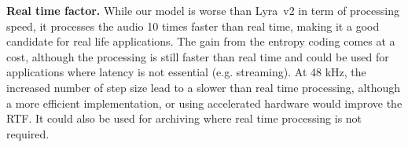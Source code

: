 {\noindent \bf Real time factor.}
While our model is worse than Lyra~v2 in term of processing speed, it processes the audio 10 times
faster than real time, making it a good candidate for real life applications. The gain from the entropy coding comes at a cost, although the processing is still faster than real time and could be used
for applications where latency is not essential (e.g. streaming). At 48 kHz, the increased number of step size lead to a slower than real time processing, although a more efficient implementation, or using 
accelerated hardware would improve the RTF. It could also be used for archiving where real time processing is not required.

